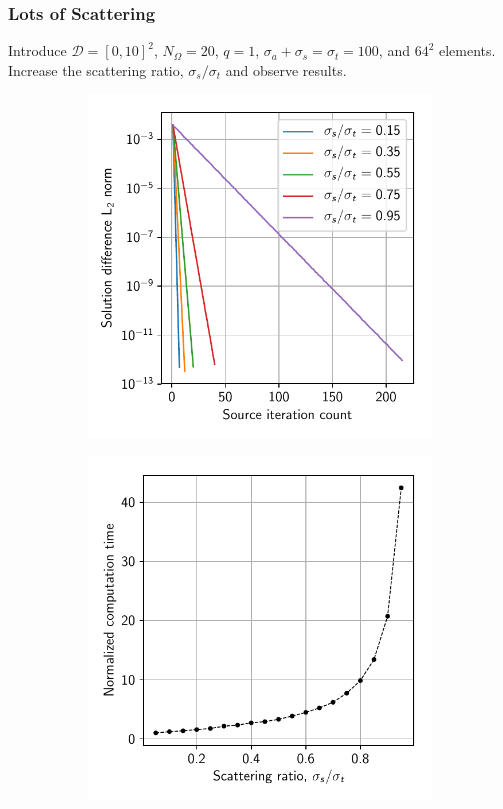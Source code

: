 \documentclass[xcolor={usenames,dvipsnames,svgnames,table}]{beamer}
\newcommand{\spatial}{\mathcal{D}} %
\begin{document}
\begin{frame}\frametitle{Lots of Scattering}
	Introduce $\spatial = [0, 10]^2$, $N_\Omega = 20$, $q = 1$, $\sigma_a + \sigma_s = \sigma_t = 100$, and $64^2$ elements. Increase the scattering ratio, $\sigma_s / \sigma_t$ and observe results.
	\begin{figure}[H]
		\centering
		\hfill
		\begin{subfigure}[t]{0.46\textwidth}
				\includegraphics[width=\linewidth]{plots/scattering_norms}
		\end{subfigure}
		\hfill
		\begin{subfigure}[t]{0.46\textwidth}
			\includegraphics[width=\linewidth]{plots/scattering_times}
		\end{subfigure}
		\hfill
	\end{figure}
\end{frame}
\end{document}
